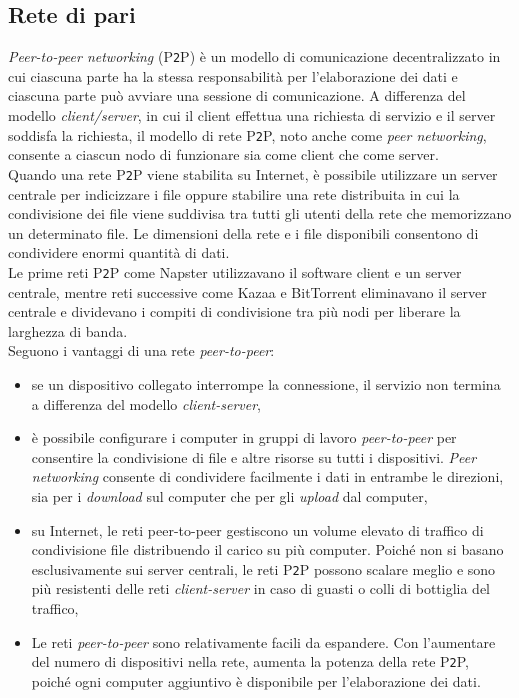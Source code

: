 \subsection{Rete di pari}
\textit{Peer-to-peer networking} (P\verb"2"P) \`{e} un modello di comunicazione decentralizzato in cui ciascuna parte ha la stessa responsabilit\`{a} per l'elaborazione dei dati e ciascuna parte pu\`{o} avviare una sessione di comunicazione. A differenza del modello\textit{ client/server}, in cui il client effettua una richiesta di servizio e il server soddisfa la richiesta, il modello di rete P\verb"2"P, noto anche come \textit{peer networking}, consente a ciascun nodo di funzionare sia come client che come server.\cite{etichetta13}\\
Quando una rete P\verb"2"P viene stabilita su Internet, \`{e} possibile utilizzare un server centrale per indicizzare i file oppure stabilire una rete distribuita in cui la condivisione dei file viene suddivisa tra tutti gli utenti della rete che memorizzano un determinato file. Le dimensioni della rete e i file disponibili consentono di condividere enormi quantit\`{a} di dati.\\ 
Le prime reti P\verb"2"P come Napster utilizzavano il software client e un server centrale, mentre reti successive come Kazaa e BitTorrent eliminavano il server centrale e dividevano i compiti di condivisione tra pi\`{u} nodi per liberare la larghezza di banda.\\


Seguono i vantaggi di una rete \textit{peer-to-peer}:
\begin{itemize}
\item
se un dispositivo collegato interrompe la connessione, il servizio non termina a differenza del modello \textit{client-server},

\item 
\`{e} possibile configurare i computer in gruppi di lavoro \textit{peer-to-peer} per consentire la condivisione di file e altre risorse su tutti i dispositivi. \textit{Peer networking} consente di condividere facilmente i dati in entrambe le direzioni, sia per i \textit{download} sul computer che per gli \textit{upload} dal computer,

\item
su Internet, le reti peer-to-peer gestiscono un volume elevato di traffico di condivisione file distribuendo il carico su pi\`{u} computer. Poich\'{e} non si basano esclusivamente sui server centrali, le reti P\verb"2"P possono scalare meglio e sono pi\`{u} resistenti delle reti \textit{client-server} in caso di guasti o colli di bottiglia del traffico,

\item
Le reti \textit{peer-to-peer} sono relativamente facili da espandere. Con l'aumentare del numero di dispositivi nella rete, aumenta la potenza della rete P\verb"2"P, poich\'{e} ogni computer aggiuntivo \`{e} disponibile per l'elaborazione dei dati.\cite{etichetta14}
\end{itemize}

